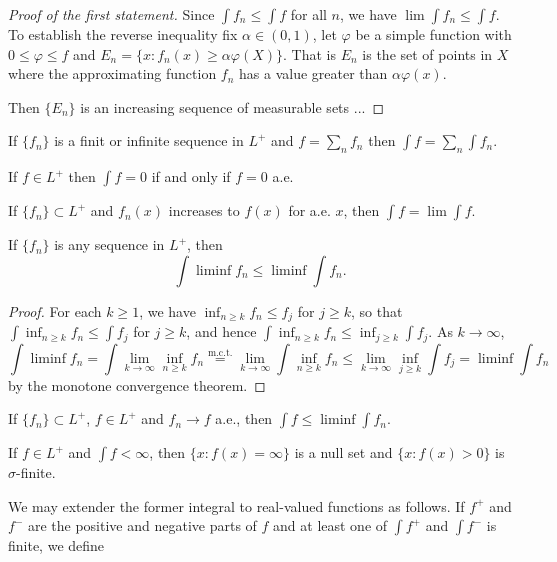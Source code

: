 \documentclass{article}
\theoremstyle{definition}
\numberwithin{equation}{section}
\begin{document}
	\begin{proof}[Proof of the first statement]
		Since $\int f_n\leq\int f$ for all $n$, we have $\lim\int f_n\leq\int f$. To establish the reverse inequality fix $\alpha\in (0,1)$, let $\varphi$ be a simple function with $0\leq\varphi\leq f$ and $E_n=\{x:f_n(x)\geq\alpha\varphi(X)\}$. That is $E_n$ is the set of points in $X$ where the approximating function $f_n$ has a value greater than $\alpha\varphi(x)$.
		
		Then $\{E_n\}$ is an increasing sequence of measurable sets {\color{orange}...}
	\end{proof}
	\begin{thm}
		If $\{f_n\}$ is a finit or infinite sequence in $L^+$ and $f=\sum_nf_n$ then $\int f=\sum_n\int f_n$.
	\end{thm}
	\begin{prop}
		If $f\in L^+$ then $\int f=0$ if and only if $f=0$ a.e.
	\end{prop}
	\begin{coro}
		If $\{f_n\}\subset L^+$ and $f_n(x)$ increases to $f(x)$ for a.e. $x$, then $\int f=\lim \int f$.
	\end{coro}
	\begin{lemma}[Fatou]
		If $\{f_n\}$ is any sequence in $L^+$, then
		\[\int\liminf f_n\leq\liminf\int f_n.\]
	\end{lemma}
	\begin{proof}
		For each $k\geq1$, we have $\inf_{n\geq k}f_n\leq f_j$ for $j\geq k$, so that $\int \inf_{n\geq k}f_n\leq\int f_j$ for $j\geq k$, and hence $\int \inf_{n\geq k}f_n\leq\inf_{j\geq k}\int f_j$. As $k\to\infty$,
		\[\int\liminf f_n=\int\lim_{k\to\infty}\inf_{n\geq k}f_n\overset{\text{m.c.t.}}{=}\lim_{k\to\infty}\int\inf_{n\geq k}f_n\leq\lim_{k\to\infty}\inf_{j\geq k}\int f_j=\liminf\int f_n\]
		by the monotone convergence theorem.
	\end{proof}
	\begin{coro}
		If $\{f_n\}\subset L^+$, $f\in L^+$ and $f_n\to f$ a.e., then $\int f\leq\liminf\int f_n$.
	\end{coro}
	\begin{prop}
		If $f\in L^+$ and $\int f<\infty$, then $\{x:f(x)=\infty\}$ is a null set and $\{x:f(x)>0\}$ is $\sigma$-finite.
	\end{prop}
	We may extender the former integral to real-valued functions as follows. If $f^+$ and $f^-$ are the positive and negative parts of $f$ and at least one of $\int f^+$ and $\int f^-$ is finite, we define
\end{document}
